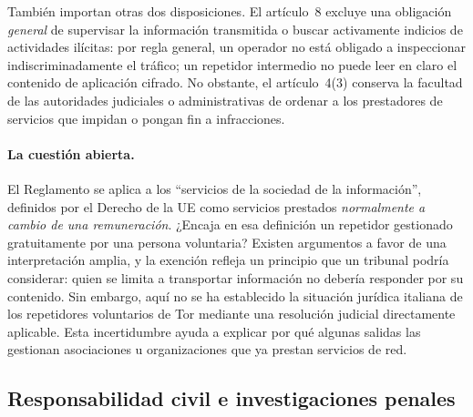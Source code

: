 También importan otras dos disposiciones. El artículo~8 excluye una obligación \emph{general} de supervisar la información transmitida o buscar activamente indicios de actividades ilícitas: por regla general, un operador no está obligado a inspeccionar indiscriminadamente el tráfico; un repetidor intermedio no puede leer en claro el contenido de aplicación cifrado. No obstante, el artículo~4(3) conserva la facultad de las autoridades judiciales o administrativas de ordenar a los prestadores de servicios que impidan o pongan fin a infracciones.

\paragraph{La cuestión abierta.} El Reglamento se aplica a los \enquote{servicios de la sociedad de la información}, definidos por el Derecho de la UE como servicios prestados \emph{normalmente a cambio de una remuneración}. ¿Encaja en esa definición un repetidor gestionado gratuitamente por una persona voluntaria? Existen argumentos a favor de una interpretación amplia, y la exención refleja un principio que un tribunal podría considerar: quien se limita a transportar información no debería responder por su contenido. Sin embargo, aquí no se ha establecido la situación jurídica italiana de los repetidores voluntarios de Tor mediante una resolución judicial directamente aplicable. Esta incertidumbre ayuda a explicar por qué algunas salidas las gestionan asociaciones u organizaciones que ya prestan servicios de red.

\subsection{Responsabilidad civil e investigaciones penales}

